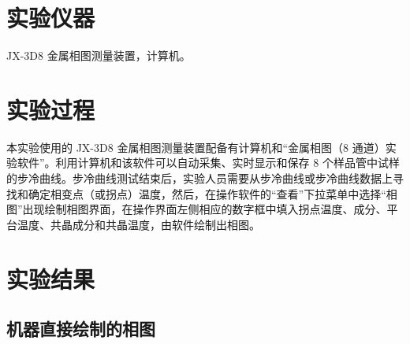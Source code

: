 \documentclass[a4paper,utf8]{article}
\begin{document}
\section{实验仪器}%
    JX-3D8 金属相图测量装置，计算机。
\section{实验过程}%
    本实验使用的 JX-3D8 金属相图测量装置配备有计算机和“金属相图（8 通道）实验软件”。利用计算机和该软件可以自动采集、实时显示和保存 8 个样品管中试样的步冷曲线。步冷曲线测试结束后，实验人员需要从步冷曲线或步冷曲线数据上寻找和确定相变点（或拐点）温度，然后，在操作软件的“查看”下拉菜单中选择“相图”出现绘制相图界面，在操作界面左侧相应的数字框中填入拐点温度、成分、平台温度、共晶成分和共晶温度，由软件绘制出相图。
\section{实验结果}
\subsection{机器直接绘制的相图}
\begin{figure}[!ht]
    \begin{floatrow}
        \hspace{10mm}
    \end{floatrow}
\end{figure}
\end{document}
